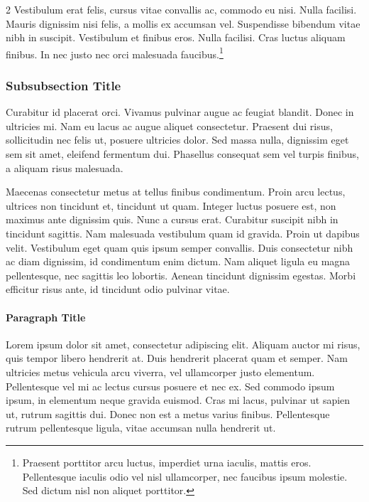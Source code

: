\documentclass[
	a4paper, %
]{CSMakotoTechnicalReport}
\begin{document}
\begin{multicols}{2}
Vestibulum erat felis, cursus vitae convallis ac, commodo eu nisi. Nulla facilisi. Mauris dignissim nisi felis, a mollis ex accumsan vel. Suspendisse bibendum vitae nibh in suscipit. Vestibulum et finibus eros. Nulla facilisi. Cras luctus aliquam finibus. In nec justo nec orci malesuada faucibus.\footnote{Praesent porttitor arcu luctus, imperdiet urna iaculis, mattis eros. Pellentesque iaculis odio vel nisl ullamcorper, nec faucibus ipsum molestie. Sed dictum nisl non aliquet porttitor.}

\subsubsection{Subsubsection Title} %

Curabitur id placerat orci. Vivamus pulvinar augue ac feugiat blandit. Donec in ultricies mi. Nam eu lacus ac augue aliquet consectetur. Praesent dui risus, sollicitudin nec felis ut, posuere ultricies dolor. Sed massa nulla, dignissim eget sem sit amet, eleifend fermentum dui. Phasellus consequat sem vel turpis finibus, a aliquam risus malesuada.

Maecenas consectetur metus at tellus finibus condimentum. Proin arcu lectus, ultrices non tincidunt et, tincidunt ut quam. Integer luctus posuere est, non maximus ante dignissim quis. Nunc a cursus erat. Curabitur suscipit nibh in tincidunt sagittis. Nam malesuada vestibulum quam id gravida. Proin ut dapibus velit. Vestibulum eget quam quis ipsum semper convallis. Duis consectetur nibh ac diam dignissim, id condimentum enim dictum. Nam aliquet ligula eu magna pellentesque, nec sagittis leo lobortis. Aenean tincidunt dignissim egestas. Morbi efficitur risus ante, id tincidunt odio pulvinar vitae.

\paragraph{Paragraph Title} %

Lorem ipsum dolor sit amet, consectetur adipiscing elit. Aliquam auctor mi risus, quis tempor libero hendrerit at. Duis hendrerit placerat quam et semper. Nam ultricies metus vehicula arcu viverra, vel ullamcorper justo elementum. Pellentesque vel mi ac lectus cursus posuere et nec ex. Sed commodo ipsum ipsum, in elementum neque gravida euismod. Cras mi lacus, pulvinar ut sapien ut, rutrum sagittis dui. Donec non est a metus varius finibus. Pellentesque rutrum pellentesque ligula, vitae accumsan nulla hendrerit ut.


\end{multicols}
\end{document}
